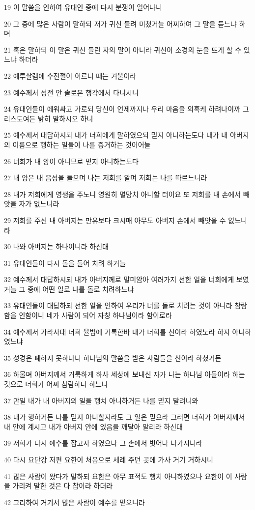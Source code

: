 \par 19 이 말씀을 인하여 유대인 중에 다시 분쟁이 일어나니
\par 20 그 중에 많은 사람이 말하되 저가 귀신 들려 미쳤거늘 어찌하여 그 말을 듣느냐 하며
\par 21 혹은 말하되 이 말은 귀신 들린 자의 말이 아니라 귀신이 소경의 눈을 뜨게 할 수 있느냐 하더라
\par 22 예루살렘에 수전절이 이르니 때는 겨울이라
\par 23 예수께서 성전 안 솔로몬 행각에서 다니시니
\par 24 유대인들이 에워싸고 가로되 당신이 언제까지나 우리 마음을 의혹케 하려나이까 그리스도여든 밝히 말하시오 하니
\par 25 예수께서 대답하시되 내가 너희에게 말하였으되 믿지 아니하는도다 내가 내 아버지의 이름으로 행하는 일들이 나를 증거하는 것이어늘
\par 26 너희가 내 양이 아니므로 믿지 아니하는도다
\par 27 내 양은 내 음성을 들으며 나는 저희를 알며 저희는 나를 따르느니라
\par 28 내가 저희에게 영생을 주노니 영원히 멸망치 아니할 터이요 또 저희를 내 손에서 빼앗을 자가 없느니라
\par 29 저희를 주신 내 아버지는 만유보다 크시매 아무도 아버지 손에서 빼앗을 수 없느니라
\par 30 나와 아버지는 하나이니라 하신대
\par 31 유대인들이 다시 돌을 들어 치려 하거늘
\par 32 예수께서 대답하시되 내가 아버지께로 말미암아 여러가지 선한 일을 너희에게 보였거늘 그 중에 어떤 일로 나를 돌로 치려하느냐
\par 33 유대인들이 대답하되 선한 일을 인하여 우리가 너를 돌로 치려는 것이 아니라 참람함을 인함이니 네가 사람이 되어 자칭 하나님이라 함이로라
\par 34 예수께서 가라사대 너희 율법에 기록한바 내가 너희를 신이라 하였노라 하지 아니하였느냐
\par 35 성경은 폐하지 못하나니 하나님의 말씀을 받은 사람들을 신이라 하셨거든
\par 36 하물며 아버지께서 거룩하게 하사 세상에 보내신 자가 나는 하나님 아들이라 하는 것으로 너희가 어찌 참람하다 하느냐
\par 37 만일 내가 내 아버지의 일을 행치 아니하거든 나를 믿지 말려니와
\par 38 내가 행하거든 나를 믿지 아니할지라도 그 일은 믿으라 그러면 너희가 아버지께서 내 안에 계시고 내가 아버지 안에 있음을 깨달아 알리라 하신대
\par 39 저희가 다시 예수를 잡고자 하였으나 그 손에서 벗어나 나가시니라
\par 40 다시 요단강 저편 요한이 처음으로 세례 주던 곳에 가사 거기 거하시니
\par 41 많은 사람이 왔다가 말하되 요한은 아무 표적도 행치 아니하였으나 요한이 이 사람을 가리켜 말한 것은 다 참이라 하더라
\par 42 그리하여 거기서 많은 사람이 예수를 믿으니라

